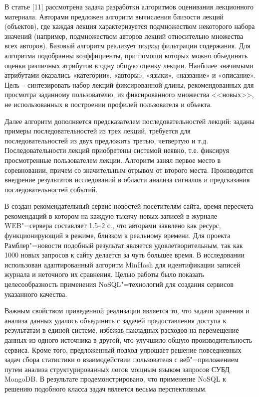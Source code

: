 \documentclass[a4paper,14pt,openany,final]{extreport} %
\begin{document}
В статье [11] рассмотрена задача разработки алгоритмов оценивания лекционного материала. Авторами предложен алгоритм вычисления близости лекций (объектов), где каждая лекция характеризуется подмножеством некоторого набора значений (например, подмножеством авторов лекций относительно множества всех авторов). Базовый алгоритм реализует подход фильтрации содержания. Для алгоритма подобранны коэффициенты, при помощи которых можно объединять оценки различных атрибутов в одну общую оценку лекции. Наиболее значимыми атрибутами оказались «категории», «авторы», «языки», «название» и «описание». Цель -- синтезировать набор лекций фиксированной длины, рекомендованных для просмотра заданному пользователю, из фиксированного множества <<новых>>, не использованных в построении профилей пользователя и объекта.

Далее алгоритм дополняется предсказателем последовательностей лекций: заданы примеры последовательностей из трех лекций, требуется для последовательностей из двух предложить третью, четвертую и т.д. Последовательности лекций приобретены системой неявно, т.е. фиксируя просмотренные пользователем лекции. Алгоритм занял первое место в соревновании, причем со значительным отрывом от второго места. Производится внедрение результатов исследований в области анализа сигналов и предсказания последовательностей событий.



    В \cite{b12} создан рекомендательный сервис новостей посетителям сайта, время пересчета рекомендаций в котором на каждую тысячу новых записей в журнале WEB"=сервера составляет 1.5--2 с., что авторами заявлено как ресурс, функционирующий в режиме, близком к реальному времени. Для проекта Рамблер"=новости подобный результат является удовлетворительным, так как 1000 новых запросов к сайту делается за чуть большее время. В исследовании использован адаптированный алгоритм MinHash для идентификации записей журнала и неточного их сравнения. Целью работы было показать целесообразность применения NoSQL"=технологий для создания сервисов указанного качества.

    Важным свойством приведенной реализации является то, что задачи хранения и анализа данных удалось объединить с задачей предоставления доступа к результатам в единой системе, избежав накладных расходов на перемещение данных из одного источника в другой, что улучшило общую производительность сервиса. Кроме того, предложенный подход упрощает решение повседневных задач сбора статистики о взаимодействии пользователя с веб"=приложением путем анализа структурированных логов мощным языком запросов СУБД MongoDB.  В результате продемонстрировано, что применение NoSQL к решению подобного класса задач является весьма перспективным.
\end{document}
